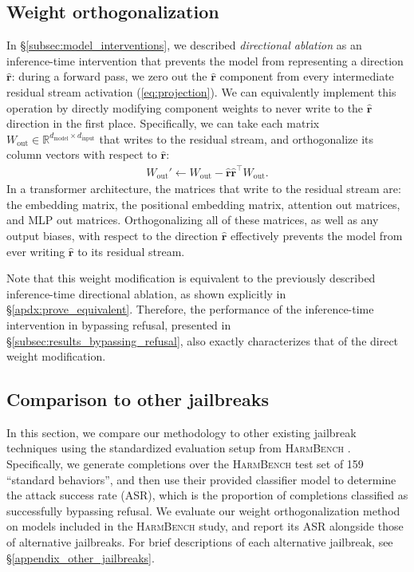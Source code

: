 \documentclass{article}
\begin{document}
\subsection{Weight orthogonalization}
\label{subsec:weight_orthogonalization}

In \S\ref{subsec:model_interventions}, we described \emph{directional ablation} as an inference-time intervention that prevents the model from representing a direction $\hat{\mathbf{r}}$: during a forward pass, we zero out the  $\hat{\mathbf{r}}$ component from every intermediate residual stream activation (\autoref{eq:projection}).
We can equivalently implement this operation by directly modifying component weights to never write to the $\hat{\mathbf{r}}$ direction in the first place.
Specifically, we can take each matrix $W_{\text{out}} \in \mathbb{R}^{d_{\text{model}} \times d_{\text{input}}}$ that writes to the residual stream, and orthogonalize its column vectors with respect to $\hat{\mathbf{r}}$:
\begin{align}
W_{\text{out}}' \leftarrow W_{\text{out}} - \hat{\mathbf{r}} \hat{\mathbf{r}}^{\intercal} W_{\text{out}}. \label{eq:weight_orthogonalization}
\end{align}
In a transformer architecture, the matrices that write to the residual stream are: the embedding matrix, the positional embedding matrix, attention out matrices, and MLP out matrices. Orthogonalizing all of these matrices, as well as any output biases, with respect to the direction $\hat{\mathbf{r}}$ effectively prevents the model from ever writing $\hat{\mathbf{r}}$ to its residual stream.

Note that this weight modification is equivalent to the previously described inference-time directional ablation, as shown explicitly in \S\ref{apdx:prove_equivalent}.
Therefore, the performance of the inference-time intervention in bypassing refusal, presented in \S\ref{subsec:results_bypassing_refusal}, also exactly characterizes that of the direct weight modification.

\subsection{Comparison to other jailbreaks}
\label{subsec:jailbreak_eval}

In this section, we compare our methodology to other existing jailbreak techniques using the standardized evaluation setup from \textsc{HarmBench} \citep{mazeika2024harmbench}. Specifically, we generate completions over the \textsc{HarmBench} test set of 159 ``standard behaviors'', and then use their provided classifier model to determine the attack success rate (ASR), which is the proportion of completions classified as successfully bypassing refusal.
We evaluate our weight orthogonalization method on models included in the \textsc{HarmBench} study, and report its ASR alongside those of alternative jailbreaks.
For brief descriptions of each alternative jailbreak, see \S\ref{appendix_other_jailbreaks}.
\end{document}
